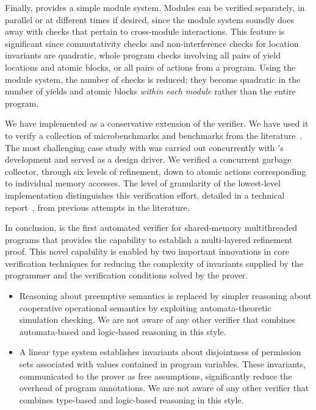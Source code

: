 Finally, \civl provides a simple module system. Modules can be
verified separately, in parallel or at different times if desired,
since the module system soundly does away with checks that pertain to cross-module interactions. 
This feature is significant since commutativity checks and non-interference checks for location invariants are quadratic, whole program checks involving all pairs of yield locations and atomic blocks, or all pairs of actions from a program. 
Using the module system, the number of checks is reduced; they become quadratic in the number of yields and atomic blocks {\em within each module} rather than the entire program. 

We have implemented \civl as a conservative extension of the \boogie verifier.  
We have used it to verify a collection of microbenchmarks and benchmarks from the 
literature~\cite{Blumofe1999,ElmasQT09,ElmasTQ05,FarzanKP14,FlanaganQ03,Herlihy2008}. 
The most challenging case study with \civl was carried out concurrently with \civl's development and served as a design driver. 
We verified a concurrent garbage collector, through six levels of refinement, 
down to atomic actions corresponding to individual memory accesses. 
The level of granularity of the lowest-level implementation distinguishes this verification effort, 
detailed in a technical report~\cite{gc-techreport}, from previous attempts in the literature. 

In conclusion, \civl is the first automated verifier for shared-memory multithreaded programs that 
provides the capability to establish a multi-layered refinement proof.
This novel capability is enabled by two important innovations in core verification techniques
for reducing the complexity of invariants supplied by the programmer and the verification conditions solved by the prover.
\begin{itemize}
\item
Reasoning about preemptive semantics is replaced by simpler reasoning about cooperative operational semantics by exploiting 
automata-theoretic simulation checking.
We are not aware of any other verifier that combines automata-based and logic-based reasoning in this style.
\item 
A linear type system establishes invariants about disjointness of permission sets associated with values contained in program variables.
These invariants, communicated to the prover as free assumptions, significantly reduce the overhead of program annotations.
We are not aware of any other verifier that combines type-based and logic-based reasoning in this style.
\end{itemize}
